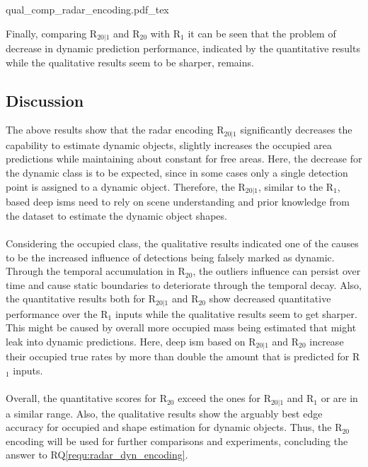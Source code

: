 \begin{center}
	{qual_comp_radar_encoding.pdf_tex}
\end{center}
Finally, comparing R$_{20|1}$ and R$_{20}$ with R$_1$ it can be seen that the problem of decrease in dynamic prediction performance, indicated by the quantitative results while the qualitative results seem to be sharper, remains.
%
\subsection{Discussion}
The above results show that the radar encoding R$_{20|1}$ significantly decreases the capability to estimate dynamic objects, slightly increases the occupied area predictions while maintaining about constant for free areas. Here, the decrease for the dynamic class is to be expected, since in some cases only a single detection point is assigned to a dynamic object. Therefore, the R$_{20|1}$, similar to the R$_1$, based deep \gls{ism}s need to rely on scene understanding and prior knowledge from the dataset to estimate the dynamic object shapes. 
\\\\
Considering the occupied class, the qualitative results indicated one of the causes to be the increased influence of detections being falsely marked as dynamic. Through the temporal accumulation in R$_{20}$, the outliers influence can persist over time and cause static boundaries to deteriorate through the temporal decay. Also, the quantitative results both for R$_{20|1}$ and R$_{20}$ show decreased quantitative performance over the R$_1$ inputs while the qualitative results seem to get sharper. This might be caused by overall more occupied mass being estimated that might leak into dynamic predictions. Here, deep \gls{ism} based on R$_{20|1}$ and R$_{20}$ increase their occupied true rates by more than double the amount that is predicted for R$_1$ inputs.
\\\\
Overall, the quantitative scores for R$_{20}$ exceed the ones for R$_{20|1}$ and R$_1$ or are in a similar range. Also, the qualitative results show the arguably best edge accuracy for occupied and shape estimation for dynamic objects. Thus, the R$_{20}$ encoding will be used for further comparisons and experiments, concluding the answer to RQ\ref{requ:radar_dyn_encoding}.
%
